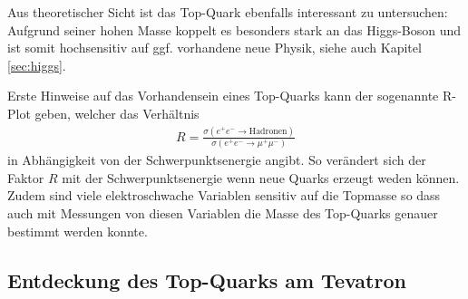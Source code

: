 Aus theoretischer Sicht ist das Top-Quark ebenfalls interessant zu untersuchen:
Aufgrund seiner hohen Masse koppelt es besonders stark an das Higgs-Boson und ist somit hochsensitiv auf ggf. vorhandene neue Physik, siehe auch Kapitel \ref{sec:higgs}.

Erste Hinweise auf das Vorhandensein eines Top-Quarks kann der sogenannte R-Plot geben, welcher das Verhältnis
\begin{align*}
	R = \frac{\sigma\left( e^+ e^- \rightarrow \text{Hadronen} \right)}{\sigma \left( e^+ e^- \rightarrow \mu^+ \mu^- \right)}
\end{align*}
in Abhängigkeit von der Schwerpunktsenergie angibt.
So verändert sich der Faktor $R$ mit der Schwerpunktsenergie wenn neue Quarks erzeugt weden können.
Zudem sind viele elektroschwache Variablen sensitiv auf die Topmasse so dass auch mit Messungen von diesen Variablen die Masse des Top-Quarks genauer bestimmt werden konnte.

\subsection{Entdeckung des Top-Quarks am Tevatron}

